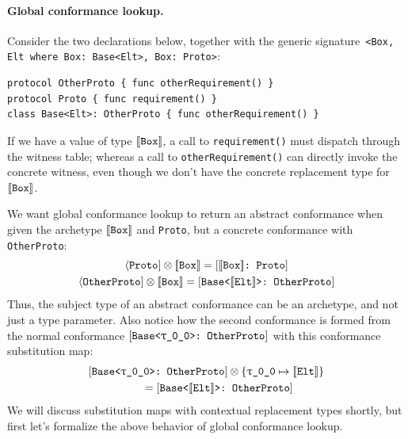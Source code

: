 \documentclass[../generics]{subfiles}
\begin{document}
\paragraph{Global conformance lookup.} Consider the two declarations below, together with the generic signature~\verb|<Box, Elt where Box: Base<Elt>, Box: Proto>|:
\begin{Verbatim}
protocol OtherProto { func otherRequirement() }
protocol Proto { func requirement() }
class Base<Elt>: OtherProto { func otherRequirement() }
\end{Verbatim}
If we have a value of type $[\![\texttt{Box}]\!]$, a call to \texttt{requirement()} must dispatch through the witness table; whereas a call to \texttt{otherRequirement()} can directly invoke the concrete witness, even though we don't have the concrete replacement type for $[\![\texttt{Box}]\!]$.

We want global conformance lookup to return an abstract conformance when given the archetype $[\![\texttt{Box}]\!]$ and \texttt{Proto}, but a concrete conformance with \texttt{OtherProto}:
\begin{gather*}
\Proto{Proto}\otimes \archetype{Box} = \ConfReq{$\archetype{Box}$}{Proto}\\
\Proto{OtherProto}\otimes \archetype{Box} = \ConfReq{Base<$\archetype{Elt}$>}{OtherProto}
\end{gather*}
Thus, the subject type of an abstract conformance can be an archetype, and not just a type parameter. Also notice how the second conformance is formed from the normal conformance $\ConfReq{Base<\rT>}{OtherProto}$ with this conformance substitution map:
\begin{gather*}
\ConfReq{Base<\rT>}{OtherProto}\otimes\SubstMap{\SubstType{\rT}{$\archetype{Elt}$}}\\
\qquad {} = \ConfReq{Base<$\archetype{Elt}$>}{OtherProto}
\end{gather*}
We will discuss substitution maps with contextual replacement types shortly, but first let's formalize the above behavior of global conformance lookup.
\end{document}
